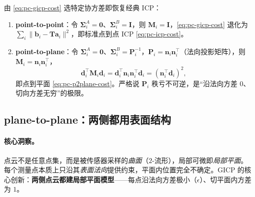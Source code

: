 \begin{proposition}\label{prop:pc-gicp-special}
由 \cref{eq:pc-gicp-cost} 选特定协方差即恢复经典 ICP：
\begin{enumerate}
  \item \textbf{point-to-point}：令 $\boldsymbol{\Sigma}_i^A=\mathbf{0}$、$\boldsymbol{\Sigma}_i^B=\mathbf{I}$，则 $\mathbf{M}_i=\mathbf{I}$，\cref{eq:pc-gicp-cost} 退化为 $\sum_i\|\mathbf{b}_i-\mathbf{T}\mathbf{a}_i\|^2$，即标准点到点 ICP \cref{eq:pc-icp-cost}。
  \item \textbf{point-to-plane}：令 $\boldsymbol{\Sigma}_i^A=\mathbf{0}$、$\boldsymbol{\Sigma}_i^B=\mathbf{P}_i^{-1}$，$\mathbf{P}_i=\mathbf{n}_i\mathbf{n}_i^\top$（法向投影矩阵），则 $\mathbf{M}_i=\mathbf{n}_i\mathbf{n}_i^\top$，
  \begin{equation}
    \mathbf{d}_i^\top\mathbf{M}_i\mathbf{d}_i=\mathbf{d}_i^\top\mathbf{n}_i\mathbf{n}_i^\top\mathbf{d}_i=(\mathbf{n}_i^\top\mathbf{d}_i)^2,
  \end{equation}
  即点到平面 \cref{eq:pc-p2plane-cost}。严格说 $\mathbf{P}_i$ 秩亏不可逆，是“沿法向方差 $0$、切向方差无穷”的极限。
\end{enumerate}
\end{proposition}

\subsection{plane-to-plane：两侧都用表面结构}
\label{sec:pc-gicp-p2p}

\paragraph{核心洞察。}
点云不是任意点集，而是被传感器采样的\emph{曲面}（$2$-流形），局部可微即\emph{局部平面}。每个测量点本质上只沿其\emph{表面法向}提供约束，平面内位置完全不确定。GICP 的核心创新：\textbf{两侧点云都建局部平面模型}——每点沿法向方差极小（$\epsilon$）、切平面内方差为 $1$。

